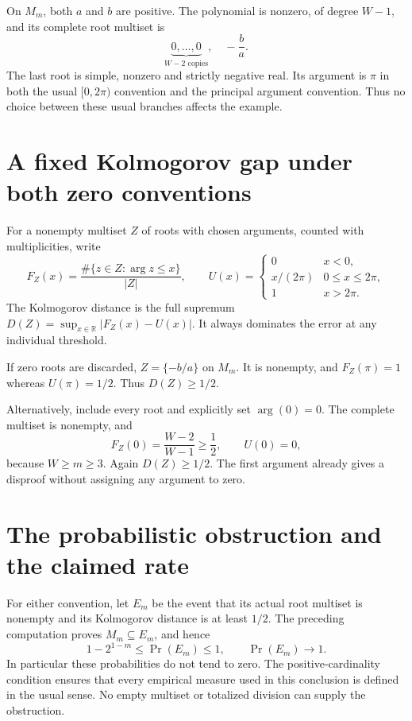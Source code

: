 \documentclass[11pt]{article}
\begin{document}
On $M_m$, both $a$ and $b$ are positive. The polynomial is
nonzero, of degree $W-1$, and its complete root multiset is
\[
        \underbrace{0,\ldots,0}_{W-2\text{ copies}},
                  \quad -\frac ba.
\]
The last root is simple, nonzero and strictly negative real.
Its argument is $\pi$ in both the usual $[0,2\pi)$ convention
and the principal argument convention. Thus no choice between
these usual branches affects the example.

\section*{A fixed Kolmogorov gap under both zero conventions}
For a nonempty multiset $Z$ of roots with chosen arguments,
counted with multiplicities, write
\[
 F_Z(x)=\frac{\#\{z\in Z:\arg z\leq x\}}{|Z|},\qquad
 U(x)=\begin{cases}0&x<0,\\x/(2\pi)&0\leq x\leq2\pi,\\1&x>2\pi.
 \end{cases}
\]
The Kolmogorov distance is the full supremum
$D(Z)=\sup_{x\in\mathbb R}|F_Z(x)-U(x)|$.
It always dominates the error at any individual threshold.

If zero roots are discarded, $Z=\{-b/a\}$ on $M_m$.
It is nonempty, and $F_Z(\pi)=1$ whereas $U(\pi)=1/2$.
Thus $D(Z)\geq1/2$.

Alternatively, include every root and explicitly set
$\arg(0)=0$. The complete multiset is nonempty, and
\[
 F_Z(0)=\frac{W-2}{W-1}\geq\frac12,\qquad U(0)=0,
\]
because $W\geq m\geq3$. Again $D(Z)\geq1/2$.
The first argument already gives a disproof without assigning
any argument to zero.

\newpage
\section*{The probabilistic obstruction and the claimed rate}
For either convention, let $E_m$ be the event that its actual
root multiset is nonempty and its Kolmogorov distance is at
least $1/2$. The preceding computation proves $M_m\subseteq E_m$,
and hence
\[
              1-2^{1-m}\leq\Pr(E_m)\leq1,
                  \qquad \Pr(E_m)\longrightarrow1.
\]
In particular these probabilities do not tend to zero.
The positive-cardinality condition ensures that every
empirical measure used in this conclusion is defined in
the usual sense. No empty multiset or totalized division
can supply the obstruction.
\end{document}
